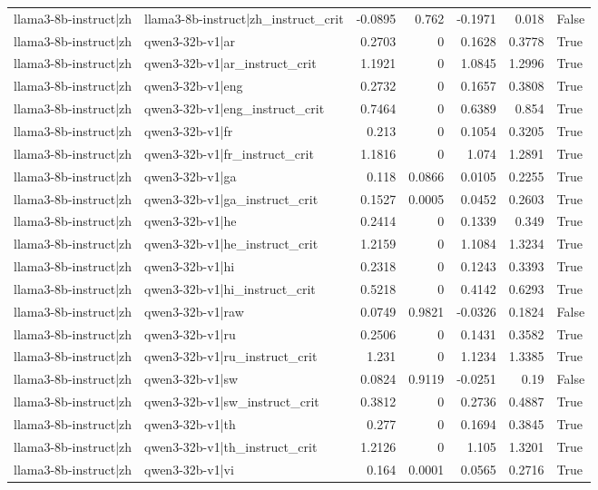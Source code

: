 \begin{table}
\begin{tabular}{l l r r r r l}
llama3-8b-instruct|zh & llama3-8b-instruct|zh_instruct_crit & -0.0895 & 0.762 & -0.1971 & 0.018 & False \\
llama3-8b-instruct|zh & qwen3-32b-v1|ar & 0.2703 & 0 & 0.1628 & 0.3778 & True \\
llama3-8b-instruct|zh & qwen3-32b-v1|ar_instruct_crit & 1.1921 & 0 & 1.0845 & 1.2996 & True \\
llama3-8b-instruct|zh & qwen3-32b-v1|eng & 0.2732 & 0 & 0.1657 & 0.3808 & True \\
llama3-8b-instruct|zh & qwen3-32b-v1|eng_instruct_crit & 0.7464 & 0 & 0.6389 & 0.854 & True \\
llama3-8b-instruct|zh & qwen3-32b-v1|fr & 0.213 & 0 & 0.1054 & 0.3205 & True \\
llama3-8b-instruct|zh & qwen3-32b-v1|fr_instruct_crit & 1.1816 & 0 & 1.074 & 1.2891 & True \\
llama3-8b-instruct|zh & qwen3-32b-v1|ga & 0.118 & 0.0866 & 0.0105 & 0.2255 & True \\
llama3-8b-instruct|zh & qwen3-32b-v1|ga_instruct_crit & 0.1527 & 0.0005 & 0.0452 & 0.2603 & True \\
llama3-8b-instruct|zh & qwen3-32b-v1|he & 0.2414 & 0 & 0.1339 & 0.349 & True \\
llama3-8b-instruct|zh & qwen3-32b-v1|he_instruct_crit & 1.2159 & 0 & 1.1084 & 1.3234 & True \\
llama3-8b-instruct|zh & qwen3-32b-v1|hi & 0.2318 & 0 & 0.1243 & 0.3393 & True \\
llama3-8b-instruct|zh & qwen3-32b-v1|hi_instruct_crit & 0.5218 & 0 & 0.4142 & 0.6293 & True \\
llama3-8b-instruct|zh & qwen3-32b-v1|raw & 0.0749 & 0.9821 & -0.0326 & 0.1824 & False \\
llama3-8b-instruct|zh & qwen3-32b-v1|ru & 0.2506 & 0 & 0.1431 & 0.3582 & True \\
llama3-8b-instruct|zh & qwen3-32b-v1|ru_instruct_crit & 1.231 & 0 & 1.1234 & 1.3385 & True \\
llama3-8b-instruct|zh & qwen3-32b-v1|sw & 0.0824 & 0.9119 & -0.0251 & 0.19 & False \\
llama3-8b-instruct|zh & qwen3-32b-v1|sw_instruct_crit & 0.3812 & 0 & 0.2736 & 0.4887 & True \\
llama3-8b-instruct|zh & qwen3-32b-v1|th & 0.277 & 0 & 0.1694 & 0.3845 & True \\
llama3-8b-instruct|zh & qwen3-32b-v1|th_instruct_crit & 1.2126 & 0 & 1.105 & 1.3201 & True \\
llama3-8b-instruct|zh & qwen3-32b-v1|vi & 0.164 & 0.0001 & 0.0565 & 0.2716 & True \\

\end{tabular}
\end{table}
